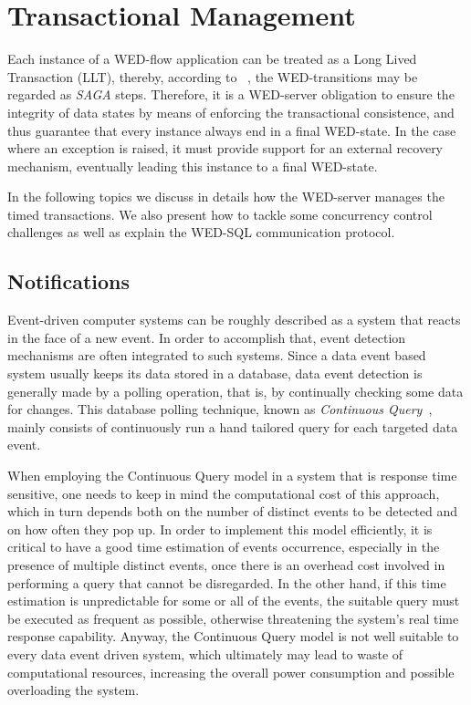 \documentclass[conference]{IEEEtran}
\begin{document}
\section{Transactional Management}
\label{GT}

Each instance of a WED-flow application can be treated as a Long Lived Transaction (LLT), thereby, according to ~\cite{SGD87},
the WED-transitions may be regarded as \emph{SAGA} steps. Therefore, it is a WED-server obligation to ensure the integrity
of data states by means of enforcing the transactional consistence, and thus guarantee that every instance always end in
a final WED-state. In the case where an exception is raised, it must provide support for an external recovery mechanism,
eventually leading this instance to a final WED-state. 

\par In the following topics we discuss in details how the WED-server manages the timed transactions. We also present how
to tackle some concurrency control challenges as well as explain the WED-SQL communication protocol. 

\subsection{Notifications}
\label{not}

Event-driven computer systems can be roughly described as a system that reacts in the face of a new event. In order to 
accomplish that, event detection mechanisms are often integrated to such systems. Since a data event based system usually keeps
its data stored in a database, data event detection is generally made by a polling operation, that is, by continually checking
some data for changes. This database polling technique, known as \emph{Continuous Query}~\cite{CQ}, mainly consists of 
continuously run a hand tailored query for each targeted data event.     

\par When employing the Continuous Query model in a system that is response time sensitive, one needs to keep in mind the
computational cost of this approach, which in turn depends both on the number of distinct events to be detected and on how 
often they pop up. In order to implement this model efficiently, it is critical to have a good time estimation of events
occurrence, especially in the presence of multiple distinct events, once there is an overhead cost involved in performing
a query that cannot be disregarded. In the other hand, if this time estimation is unpredictable for some or all of the
events, the suitable query must be executed as frequent as possible, otherwise threatening the system's real time response 
capability. Anyway, the Continuous Query model is not well suitable to every data event driven system, which ultimately
may lead to waste of computational resources, increasing the overall power consumption and possible overloading the system.     
  
\end{document}
